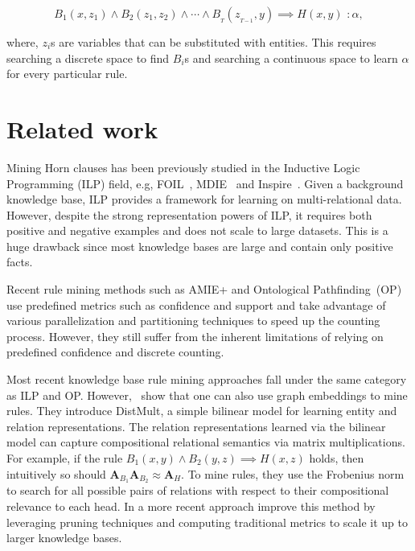\documentclass{article}
\newcommand{\mb}[1]{\mathbf{#1}}
\begin{document}
\begin{equation}
B_1(x, z_1) \land B_2(z_1,z_2) \land \cdots \land B_{\scriptstyle_{T}}(z_{\scriptstyle_{T-1}}, y) \implies H(x,y) \, \, :\alpha,
\end{equation}


where, $z_i$s are variables that can be substituted with entities. This requires searching a discrete space to find $B_i$s and searching a continuous space to learn $\alpha$ for every particular rule. 

\section{Related work}
\label{sec:related_work}


Mining Horn clauses has been previously studied in the Inductive Logic Programming (ILP) field, e.g, FOIL~\cite{quinlan1990learning}, MDIE~\cite{muggleton1995inverse} and Inspire~\cite{schuller2018best}. Given a background knowledge base, ILP provides a framework for learning on multi-relational data. However, despite the strong representation powers of ILP, it requires both positive and negative examples and does not scale to large datasets. This is a huge drawback since most knowledge bases are large and contain only positive facts.

Recent rule mining methods such as AMIE+ \cite{galarraga2015fast} and Ontological Pathfinding~(OP)~\cite{chen2016ontological} use predefined metrics such as confidence and support and take advantage of various parallelization and partitioning techniques to speed up the counting process. However, they still suffer from the inherent limitations of relying on predefined confidence and discrete counting.


Most recent knowledge base rule mining approaches fall under the same category as ILP and OP. However,~\citet{Yang2015EmbeddingEA} show that one can also use graph embeddings to mine rules. They introduce DistMult, a simple bilinear model for learning entity and relation representations. The relation representations learned via the bilinear model can capture compositional relational semantics via matrix multiplications. For example, if the rule $B_1(x,y) \land B_2(y,z) \implies H(x,z)$ holds, then intuitively so should $\mb{A}_{B_1} \mb{A}_{B_2} \approx \mb{A}_{H}$. To mine rules, they use the Frobenius norm to search for all possible pairs of relations with respect to their compositional relevance to each head. In a more recent approach \citet{omran2018scalable} improve this method by leveraging pruning techniques and computing traditional metrics to scale it up to larger knowledge bases.
\end{document}
